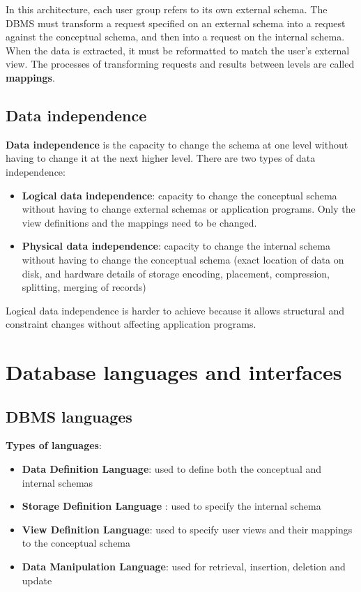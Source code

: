 In this architecture, each user group refers to its own external schema. The DBMS must transform a request specified on an external schema into a request against the conceptual schema, and then into a request on the internal schema. When the data is extracted, it must be reformatted to match the user's external view. The processes of transforming requests and results between levels are called \textbf{mappings}.

\subsection{Data independence}

\textbf{Data independence} is the capacity to change the schema at one level without having to change it at the next higher level. There are two types of data independence:\\

\begin{itemize}
    \item \textbf{Logical data independence}: capacity to change the conceptual schema without having to change external schemas or application programs. Only the view definitions and the mappings need to be changed.
    \item \textbf{Physical data independence}: capacity to change the internal schema without having to change the conceptual schema (exact location of data on disk, and hardware details of storage encoding, placement, compression, splitting, merging of records) 
\end{itemize}

Logical data independence is harder to achieve because it allows structural and constraint changes without affecting application programs.

\section{Database languages and interfaces}

\subsection{DBMS languages}

\textbf{Types of languages}:\\

\begin{itemize}
    \item \textbf{Data Definition Language}: used to define both the conceptual and internal schemas
    \item \textbf{Storage Definition Language} : used to specify the internal schema
    \item \textbf{View Definition Language}: used to specify user views and their mappings to the conceptual schema
    \item \textbf{Data Manipulation Language}: used for retrieval, insertion, deletion and update
\end{itemize}

